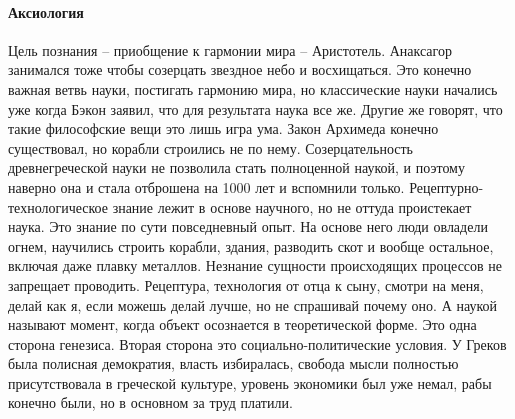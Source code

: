 \documentclass[a4paper, 12pt]{article}
\begin{document}
\paragraph{Аксиология}
Цель познания -- приобщение к гармонии мира -- Аристотель. Анаксагор 
занимался тоже чтобы созерцать звездное небо и восхищаться. Это конечно 
важная ветвь науки, постигать гармонию мира, но классические науки 
начались уже когда Бэкон заявил, что для результата наука все же. Другие 
же говорят, что такие философские вещи это лишь игра ума. Закон Архимеда 
конечно существовал, но корабли строились не по нему. Созерцательность 
древнегреческой науки не позволила стать полноценной наукой, и поэтому 
наверно она и стала отброшена на 1000 лет и вспомнили только. 
Рецептурно-технологическое знание лежит в основе научного, но не оттуда 
проистекает наука. Это знание по сути повседневный опыт. На основе него 
люди овладели огнем, научились строить корабли, здания, разводить скот 
и вообще остальное, включая даже плавку металлов. Незнание сущности 
происходящих процессов не запрещает проводить. Рецептура, технология от 
отца к сыну, смотри на меня, делай как я, если можешь делай лучше, но не 
спрашивай почему оно. А наукой называют момент, когда объект осознается 
в теоретической форме. Это одна сторона генезиса. Вторая сторона это 
социально-политические условия. У Греков была полисная демократия, 
власть избиралась, свобода мысли полностью присутствовала в греческой 
культуре, уровень экономики был уже немал, рабы конечно были, но 
в основном за труд платили.
\end{document}

